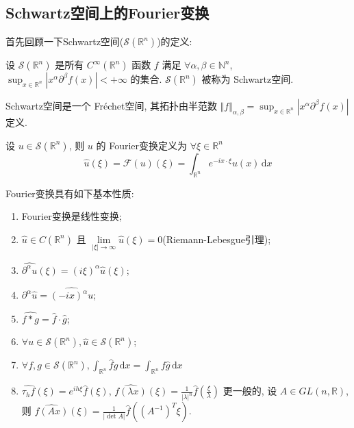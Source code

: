 \documentclass[11pt]{ctexart}[UTF8]
\begin{document}
\subsection{Schwartz空间上的Fourier变换}
首先回顾一下Schwartz空间($\mathscr{S}(\mathbb{R}^{n})$)的定义:
\begin{definition}[Schwartz空间]
    设 $\mathscr{S}(\mathbb{R}^{n})$ 是所有 $C^{\infty}(\mathbb{R}^{n})$ 函数 $f$ 满足 $\forall \alpha, \beta \in \mathbb{N}^{n}$, $\sup_{x \in \mathbb{R}^{n}} |x^{\alpha} \partial^{\beta} f(x)| < +\infty$ 的集合. $\mathscr{S}(\mathbb{R}^{n})$ 被称为 Schwartz空间.
\end{definition}
\begin{remark}
    Schwartz空间是一个 Fréchet空间, 其拓扑由半范数 $\Vert f \Vert_{\alpha,\beta} = \sup_{x \in \mathbb{R}^{n}} |x^{\alpha} \partial^{\beta} f(x)|$ 定义.
\end{remark}
\begin{definition}[Fourier变换]
    设 $u \in \mathscr{S}(\mathbb{R}^{n})$, 则 $u$ 的 Fourier变换定义为 $\forall \xi \in \mathbb{R}^{n}$
    \begin{equation*}
        \widehat{u}(\xi) = \mathscr{F}(u)(\xi) = \int_{\mathbb{R}^{n}} e^{-i x \cdot \xi} u(x) \, \mathrm{d}x
    \end{equation*}
\end{definition}
Fourier变换具有如下基本性质:
\begin{property}\leavevmode
    \begin{enumerate}
        \item Fourier变换是线性变换;
        \item $\widehat{u} \in C(\mathbb{R}^{n})$ 且 $\lim\limits_{|\xi| \to \infty} \widehat{u}(\xi) = 0$(Riemann-Lebesgue引理);
        \item $\widehat{\partial^{\alpha}u}(\xi) = (i\xi)^{\alpha} \widehat{u}(\xi)$;
        \item $\partial^{\alpha}\widehat{u} = \widehat{(-ix)^{\alpha}u}$;
        \item $\widehat{f*g} = \widehat{f} \cdot \widehat{g}$;
        \item $\forall u \in \mathscr{S}(\mathbb{R}^{n}), \widehat{u} \in \mathscr{S}(\mathbb{R}^{n})$;
        \item $\forall f,g \in \mathscr{S}(\mathbb{R}^{n}), \int_{\mathbb{R}^{n}} \widehat{f} g \, \mathrm{d}x = \int_{\mathbb{R}^{n}} f \widehat{g} \, \mathrm{d}x$
        \item $\widehat{\tau_{h}f}(\xi) = e^{ih\xi}\widehat{f}(\xi)$, $\widehat{f(\lambda x)}(\xi) = \frac{1}{|\lambda|^{n}} \widehat{f}\left(\frac{\xi}{\lambda}\right)$ 更一般的, 设 $A \in GL(n, \mathbb{R})$, 则 $\widehat{f(Ax)}(\xi) = \frac{1}{|\det A|} \widehat{f}\left((A^{-1})^{T}\xi\right)$.
    \end{enumerate}
\end{property}
\end{document}

